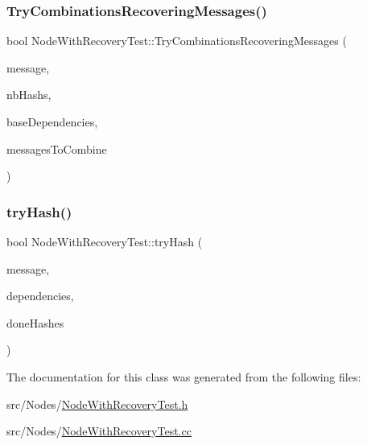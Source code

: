 \mbox{\label{class_node_with_recovery_test_ae1d2089be117daef7b2ee4dfd6b92e7d}} 
\subsubsection{\texorpdfstring{Try\+Combinations\+Recovering\+Messages()}{TryCombinationsRecoveringMessages()}}
{\footnotesize\ttfamily bool Node\+With\+Recovery\+Test\+::\+Try\+Combinations\+Recovering\+Messages (\begin{DoxyParamCaption}\item[{const \hyperlink{structures_8h_a7e7bdc1d2fff8a9436f2f352b2711ed6}{message\+Info} \&}]{message,  }\item[{unsigned int \&}]{nb\+Hashs,  }\item[{const \hyperlink{class_total_dependencies}{Total\+Dependencies} \&}]{base\+Dependencies,  }\item[{const vector$<$ \hyperlink{structures_8h_a83a1d9a070efa5341da84cfd8e28d3e5}{id\+Msg} $>$ \&}]{messages\+To\+Combine }\end{DoxyParamCaption})\hspace{0.3cm}{\ttfamily [protected]}}

\mbox{\label{class_node_with_recovery_test_a5417b50e5d5e272c8ef70ff962c0ea86}} 
\subsubsection{\texorpdfstring{try\+Hash()}{tryHash()}}
{\footnotesize\ttfamily bool Node\+With\+Recovery\+Test\+::try\+Hash (\begin{DoxyParamCaption}\item[{const \hyperlink{structures_8h_a7e7bdc1d2fff8a9436f2f352b2711ed6}{message\+Info} \&}]{message,  }\item[{const \hyperlink{class_total_dependencies}{Total\+Dependencies} \&}]{dependencies,  }\item[{unsigned}]{done\+Hashes }\end{DoxyParamCaption})\hspace{0.3cm}{\ttfamily [protected]}}



The documentation for this class was generated from the following files\+:\begin{DoxyCompactItemize}
\item 
src/\+Nodes/\hyperlink{_node_with_recovery_test_8h}{Node\+With\+Recovery\+Test.\+h}\item 
src/\+Nodes/\hyperlink{_node_with_recovery_test_8cc}{Node\+With\+Recovery\+Test.\+cc}\end{DoxyCompactItemize}
